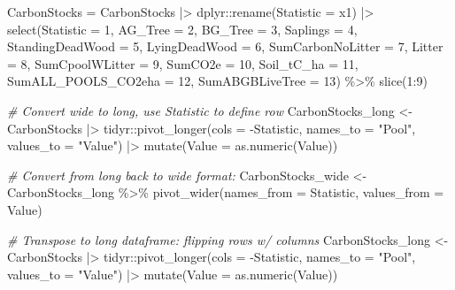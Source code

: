 \documentclass[
]{article}
\newenvironment{Shaded}{}{}
\newcommand{\AttributeTok}[1]{\textcolor[rgb]{0.49,0.56,0.16}{#1}}
\newcommand{\CommentTok}[1]{\textcolor[rgb]{0.38,0.63,0.69}{\textit{#1}}}
\newcommand{\DecValTok}[1]{\textcolor[rgb]{0.25,0.63,0.44}{#1}}
\newcommand{\FunctionTok}[1]{\textcolor[rgb]{0.02,0.16,0.49}{#1}}
\newcommand{\NormalTok}[1]{#1}
\newcommand{\OtherTok}[1]{\textcolor[rgb]{0.00,0.44,0.13}{#1}}
\newcommand{\SpecialCharTok}[1]{\textcolor[rgb]{0.25,0.44,0.63}{#1}}
\newcommand{\StringTok}[1]{\textcolor[rgb]{0.25,0.44,0.63}{#1}}
\begin{document}
\begin{Shaded}
\begin{Highlighting}[numbers=left,,]
\NormalTok{CarbonStocks }\OtherTok{=}\NormalTok{ CarbonStocks }\SpecialCharTok{|\textgreater{}}
\NormalTok{    dplyr}\SpecialCharTok{::}\FunctionTok{rename}\NormalTok{(}\AttributeTok{Statistic =}\NormalTok{ x1) }\SpecialCharTok{|\textgreater{}}
    \FunctionTok{select}\NormalTok{(}\AttributeTok{Statistic =} \DecValTok{1}\NormalTok{, }\AttributeTok{AG\_Tree =} \DecValTok{2}\NormalTok{, }\AttributeTok{BG\_Tree =} \DecValTok{3}\NormalTok{, }\AttributeTok{Saplings =} \DecValTok{4}\NormalTok{, }\AttributeTok{StandingDeadWood =} \DecValTok{5}\NormalTok{,}
        \AttributeTok{LyingDeadWood =} \DecValTok{6}\NormalTok{, }\AttributeTok{SumCarbonNoLitter =} \DecValTok{7}\NormalTok{, }\AttributeTok{Litter =} \DecValTok{8}\NormalTok{, }\AttributeTok{SumCpoolWLitter =} \DecValTok{9}\NormalTok{,}
        \AttributeTok{SumCO2e =} \DecValTok{10}\NormalTok{, }\AttributeTok{Soil\_tC\_ha =} \DecValTok{11}\NormalTok{, }\AttributeTok{SumALL\_POOLS\_CO2eha =} \DecValTok{12}\NormalTok{, }\AttributeTok{SumABGBLiveTree =} \DecValTok{13}\NormalTok{) }\SpecialCharTok{\%\textgreater{}\%}
    \FunctionTok{slice}\NormalTok{(}\DecValTok{1}\SpecialCharTok{:}\DecValTok{9}\NormalTok{)}

\CommentTok{\# Convert wide to long, use \textquotesingle{}Statistic\textquotesingle{} to define row}
\NormalTok{CarbonStocks\_long }\OtherTok{\textless{}{-}}\NormalTok{ CarbonStocks }\SpecialCharTok{|\textgreater{}}
\NormalTok{    tidyr}\SpecialCharTok{::}\FunctionTok{pivot\_longer}\NormalTok{(}\AttributeTok{cols =} \SpecialCharTok{{-}}\NormalTok{Statistic, }\AttributeTok{names\_to =} \StringTok{"Pool"}\NormalTok{, }\AttributeTok{values\_to =} \StringTok{"Value"}\NormalTok{) }\SpecialCharTok{|\textgreater{}}
    \FunctionTok{mutate}\NormalTok{(}\AttributeTok{Value =} \FunctionTok{as.numeric}\NormalTok{(Value))}

\CommentTok{\# Convert from long back to wide format:}
\NormalTok{CarbonStocks\_wide }\OtherTok{\textless{}{-}}\NormalTok{ CarbonStocks\_long }\SpecialCharTok{\%\textgreater{}\%}
    \FunctionTok{pivot\_wider}\NormalTok{(}\AttributeTok{names\_from =}\NormalTok{ Statistic, }\AttributeTok{values\_from =}\NormalTok{ Value)}

\CommentTok{\# Transpose to long dataframe: flipping rows w/ columns}
\NormalTok{CarbonStocks\_long }\OtherTok{\textless{}{-}}\NormalTok{ CarbonStocks }\SpecialCharTok{|\textgreater{}}
\NormalTok{    tidyr}\SpecialCharTok{::}\FunctionTok{pivot\_longer}\NormalTok{(}\AttributeTok{cols =} \SpecialCharTok{{-}}\NormalTok{Statistic, }\AttributeTok{names\_to =} \StringTok{"Pool"}\NormalTok{, }\AttributeTok{values\_to =} \StringTok{"Value"}\NormalTok{) }\SpecialCharTok{|\textgreater{}}
    \FunctionTok{mutate}\NormalTok{(}\AttributeTok{Value =} \FunctionTok{as.numeric}\NormalTok{(Value))}


\end{Highlighting}
\end{Shaded}
\end{document}
